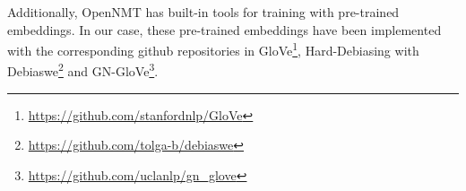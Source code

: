 \documentclass[11pt,a4paper]{article}
\begin{document}
Additionally, OpenNMT has built-in tools for training with pre-trained embeddings. 
In our case, these pre-trained embeddings have been implemented with the corresponding github repositories in GloVe\footnote{\url{https://github.com/stanfordnlp/GloVe}}, Hard-Debiasing with Debiaswe\footnote{\url{https://github.com/tolga-b/debiaswe}} and GN-GloVe\footnote{\url{https://github.com/uclanlp/gn_glove}}.

\end{document}
